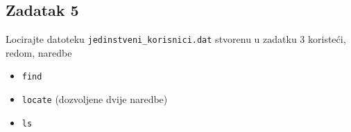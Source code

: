 \documentclass[12pt,a4paper]{article}
\begin{document}
  \subsection*{Zadatak 5}
  Locirajte datoteku \texttt{jedinstveni\_korisnici.dat} stvorenu u zadatku 3 koristeći, redom, naredbe
  \begin{itemize}
    \item \texttt{find}
    \item \texttt{locate} (dozvoljene dvije naredbe)
    \item \texttt{ls}
  \end{itemize}
\end{document}

